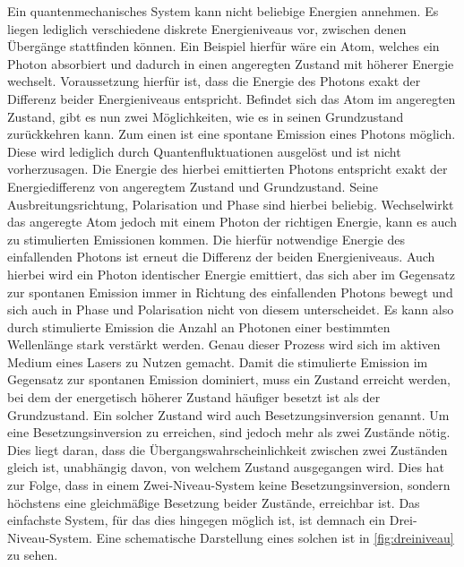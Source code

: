 Ein quantenmechanisches System kann nicht beliebige Energien annehmen. Es liegen lediglich verschiedene diskrete Energieniveaus vor, zwischen denen Übergänge
stattfinden können. Ein Beispiel hierfür wäre ein Atom, welches ein Photon absorbiert und dadurch in einen angeregten Zustand mit höherer Energie wechselt.
Voraussetzung hierfür ist, dass die Energie des Photons exakt der Differenz beider Energieniveaus entspricht.
\newline
Befindet sich das Atom im angeregten Zustand, gibt es nun zwei Möglichkeiten, wie es in seinen Grundzustand zurückkehren kann. Zum einen ist eine spontane
Emission eines Photons möglich. Diese wird lediglich durch Quantenfluktuationen ausgelöst und ist nicht vorherzusagen. Die Energie des hierbei emittierten
Photons entspricht exakt der Energiedifferenz von angeregtem Zustand und Grundzustand. Seine Ausbreitungsrichtung, Polarisation und Phase sind hierbei beliebig.
\newline
Wechselwirkt das angeregte Atom jedoch mit einem Photon der richtigen Energie, kann es auch zu stimulierten Emissionen kommen. Die hierfür notwendige Energie 
des einfallenden Photons ist erneut die Differenz der beiden Energieniveaus. Auch hierbei wird ein Photon identischer Energie emittiert, das sich aber im
Gegensatz zur spontanen Emission immer in Richtung des einfallenden Photons bewegt und sich auch in Phase und Polarisation nicht von diesem unterscheidet.
\newline
Es kann also durch stimulierte Emission die Anzahl an Photonen einer bestimmten Wellenlänge stark verstärkt werden. Genau dieser Prozess wird sich im aktiven
Medium eines Lasers zu Nutzen gemacht. Damit die stimulierte Emission im Gegensatz zur spontanen Emission dominiert, muss ein Zustand erreicht werden, bei dem
der energetisch höherer Zustand häufiger besetzt ist als der Grundzustand. Ein solcher Zustand wird auch Besetzungsinversion genannt.
\newline
Um eine Besetzungsinversion zu erreichen, sind jedoch mehr als zwei Zustände nötig. Dies liegt daran, dass die Übergangswahrscheinlichkeit zwischen zwei Zuständen
gleich ist, unabhängig davon, von welchem Zustand ausgegangen wird. Dies hat zur Folge, dass in einem Zwei-Niveau-System keine Besetzungsinversion, sondern höchstens
eine gleichmäßige Besetzung beider Zustände, erreichbar ist. Das einfachste System, für das dies hingegen möglich ist, ist demnach ein Drei-Niveau-System. Eine
schematische Darstellung eines solchen ist in \autoref{fig:dreiniveau} zu sehen.

